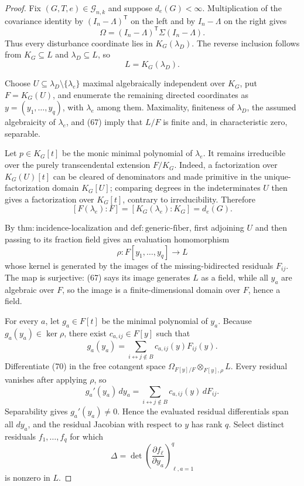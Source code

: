 \documentclass{article}
\begin{document}
\begin{proof}
Fix \((G,T,e)\in\mathcal G_{n,k}\) and suppose \(d_e(G)<\infty\).  Multiplication of the covariance identity by \((I_n-\Lambda)^{\mathsf T}\) on the left and by \(I_n-\Lambda\) on the right gives
\[
 \Omega=(I_n-\Lambda)^{\mathsf T}\Sigma(I_n-\Lambda).
\tag{66}
\]
Thus every disturbance coordinate lies in \(K_G(\lambda_D)\).  The reverse inclusion follows from \(K_G\subseteq L\) and \(\lambda_D\subseteq L\), so
\[
 L=K_G(\lambda_D).
\tag{67}
\]

Choose \(U\subseteq\lambda_D\setminus\{\lambda_e\}\) maximal algebraically independent over \(K_G\), put \(F=K_G(U)\), and enumerate the remaining directed coordinates as \(y=(y_1,\ldots,y_q)\), with \(\lambda_e\) among them.  Maximality, finiteness of \(\lambda_D\), the assumed algebraicity of \(\lambda_e\), and (67) imply that \(L/F\) is finite and, in characteristic zero, separable.

Let \(p\in K_G[t]\) be the monic minimal polynomial of \(\lambda_e\).  It remains irreducible over the purely transcendental extension \(F/K_G\).  Indeed, a factorization over \(K_G(U)[t]\) can be cleared of denominators and made primitive in the unique-factorization domain \(K_G[U]\); comparing degrees in the indeterminates \(U\) then gives a factorization over \(K_G[t]\), contrary to irreducibility.  Therefore
\[
 [F(\lambda_e):F]=[K_G(\lambda_e):K_G]=d_e(G).
\tag{68}
\]

By \(\mathrm{thm:incidence\mbox{-}localization}\) and \(\mathrm{def:generic\mbox{-}fiber}\), first adjoining \(U\) and then passing to its fraction field gives an evaluation homomorphism
\[
 \rho:F[y_1,\ldots,y_q]\longrightarrow L
\tag{69}
\]
whose kernel is generated by the images of the missing-bidirected residuals \(F_{ij}\).  The map is surjective: (67) says its image generates \(L\) as a field, while all \(y_a\) are algebraic over \(F\), so the image is a finite-dimensional domain over \(F\), hence a field.

For every \(a\), let \(g_a\in F[t]\) be the minimal polynomial of \(y_a\).  Because \(g_a(y_a)\in\ker\rho\), there exist \(c_{a,ij}\in F[y]\) such that
\[
 g_a(y_a)=\sum_{i\leftrightarrow j\notin B}c_{a,ij}(y)F_{ij}(y).
\tag{70}
\]
Differentiate (70) in the free cotangent space \(\Omega_{F[y]/F}\otimes_{F[y],\rho}L\).  Every residual vanishes after applying \(\rho\), so
\[
 g_a'(y_a)\,dy_a
 =\sum_{i\leftrightarrow j\notin B}c_{a,ij}(y)\,dF_{ij}.
\tag{71}
\]
Separability gives \(g_a'(y_a)\ne0\).  Hence the evaluated residual differentials span all \(dy_a\), and the residual Jacobian with respect to \(y\) has rank \(q\).  Select distinct residuals \(f_1,\ldots,f_q\) for which
\[
 \Delta=\det\left(\frac{\partial f_\ell}{\partial y_a}\right)_{\ell,a=1}^{q}
\tag{72}
\]
is nonzero in \(L\).


\end{proof}
\end{document}
